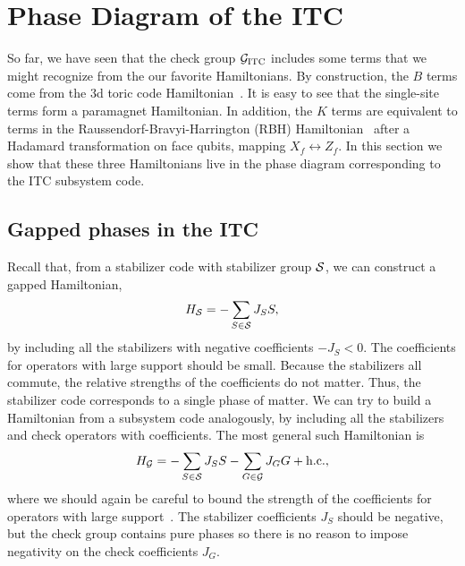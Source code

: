 \section{Phase Diagram of the ITC} \label{sec:phase}

So far, we have seen that the check group $\G_\ITC$ includes some terms that we might recognize from the our favorite Hamiltonians. By construction, the $B$ terms come from the 3d toric code Hamiltonian~\cite{CastelnovoChamon2008}. It is easy to see that the single-site terms form a paramagnet Hamiltonian. In addition, the $K$ terms are equivalent to terms in the Raussendorf-Bravyi-Harrington (RBH) Hamiltonian~\cite{Raussendorf2005LongRange} after a Hadamard transformation on face qubits, mapping $X_f \leftrightarrow Z_f$. In this section we show that these three Hamiltonians live in the phase diagram corresponding to the ITC subsystem code.

\subsection{Gapped phases in the ITC} \label{sub:phases}

Recall that, from a stabilizer code with stabilizer group $\S$, we can construct a gapped Hamiltonian,
\begin{align}
H_\S = -\sum_{S \in \S} J_S S, \label{eqn:H-S}
\end{align}
by including all the stabilizers with negative coefficients $-J_S < 0$. The coefficients for operators with large support should be small.
Because the stabilizers all commute, the relative strengths of the coefficients do not matter. Thus, the stabilizer code corresponds to a single phase of matter. We can try to build a Hamiltonian from a subsystem code analogously, by including all the stabilizers and check operators with coefficients. The most general such Hamiltonian is
\begin{align}
H_\G = -\sum_{S \in \S} J_S S - \sum_{G \in \G} J_G G + \text{h.c.}, \label{eqn:H-G}
\end{align}
where we should again be careful to bound the strength of the coefficients for operators with large support~\cite{Ellison2022Subsystem}. The stabilizer coefficients $J_S$ should be negative, but the check group contains pure phases so there is no reason to impose negativity on the check coefficients $J_G$. 


